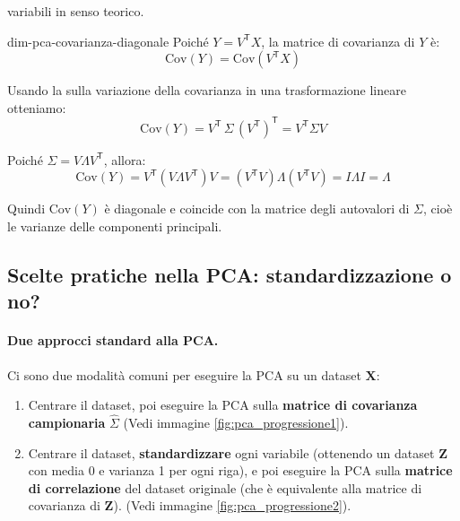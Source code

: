 variabili in senso teorico.
\begin{dimostrazione}{}{dim-pca-covarianza-diagonale}
Poiché \( Y = V^\mathsf{T} X \), la matrice di covarianza di \( Y \) è:
\[
\mathrm{Cov}(Y) = \mathrm{Cov}(V^\mathsf{T} X)
\]

Usando la  sulla variazione della covarianza in una
trasformazione lineare otteniamo:
\[
    \mathrm{Cov}(Y)
    = V^\mathsf{T} \, \Sigma \, (V^\mathsf{T})^\mathsf{T}
    = V^\mathsf{T} \Sigma V
\]

Poiché \( \Sigma = V \Lambda V^\mathsf{T} \), allora:
\[
\mathrm{Cov}(Y) = V^\mathsf{T} (V \Lambda V^\mathsf{T}) V = (V^\mathsf{T} V)
\Lambda (V^\mathsf{T} V) = I \Lambda I = \Lambda
\]

Quindi \( \mathrm{Cov}(Y) \) è diagonale e coincide con la matrice degli
autovalori di \( \Sigma \), cioè le varianze delle componenti principali.
\end{dimostrazione}

\subsection{Scelte pratiche nella PCA: standardizzazione o no?}

\paragraph{Due approcci standard alla PCA.}
Ci sono due modalità comuni per eseguire la PCA su un dataset \(\mathbf{X}\):

\begin{enumerate}
  \item Centrare il dataset, poi eseguire la PCA sulla \textbf{matrice di
  covarianza campionaria} \(\hat{\Sigma}\) (Vedi
  immagine \ref{fig:pca_progressione1}).
  \item Centrare il dataset, \textbf{standardizzare} ogni variabile (ottenendo
  un dataset \(\mathbf{Z}\) con media 0 e varianza 1 per ogni riga), e poi
  eseguire la PCA sulla \textbf{matrice di correlazione} del dataset originale
  (che è equivalente alla matrice di covarianza di \(\mathbf{Z}\)). (Vedi
  immagine \ref{fig:pca_progressione2}).
\end{enumerate}

